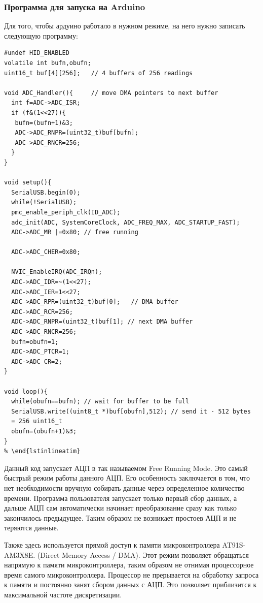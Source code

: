 \documentclass[../paper.tex]{subfiles}
\begin{document}
\subsubsection{Программа для запуска на Arduino}
Для того, чтобы ардуино работало в нужном режиме, на него нужно записать следующую программу:
\begin{lstlisting}
#undef HID_ENABLED
volatile int bufn,obufn;
uint16_t buf[4][256];   // 4 buffers of 256 readings

void ADC_Handler(){     // move DMA pointers to next buffer
  int f=ADC->ADC_ISR;
  if (f&(1<<27)){
   bufn=(bufn+1)&3;
   ADC->ADC_RNPR=(uint32_t)buf[bufn];
   ADC->ADC_RNCR=256;
  } 
}

void setup(){
  SerialUSB.begin(0);
  while(!SerialUSB);
  pmc_enable_periph_clk(ID_ADC);
  adc_init(ADC, SystemCoreClock, ADC_FREQ_MAX, ADC_STARTUP_FAST);
  ADC->ADC_MR |=0x80; // free running

  ADC->ADC_CHER=0x80; 

  NVIC_EnableIRQ(ADC_IRQn);
  ADC->ADC_IDR=~(1<<27);
  ADC->ADC_IER=1<<27;
  ADC->ADC_RPR=(uint32_t)buf[0];   // DMA buffer
  ADC->ADC_RCR=256;
  ADC->ADC_RNPR=(uint32_t)buf[1]; // next DMA buffer
  ADC->ADC_RNCR=256;
  bufn=obufn=1;
  ADC->ADC_PTCR=1;
  ADC->ADC_CR=2;
}

void loop(){
  while(obufn==bufn); // wait for buffer to be full
  SerialUSB.write((uint8_t *)buf[obufn],512); // send it - 512 bytes
  = 256 uint16_t
  obufn=(obufn+1)&3;    
}
% \end{lstinlineatim}
\end{lstlisting}


Данный код запускает АЦП в так называемом Free Running Mode. Это самый быстрый режим работы данного АЦП. Его особенность заключается в том, что нет необходимости вручную собирать данные через определенное количество времени. Программа пользователя запускает только первый сбор данных, а дальше АЦП сам автоматически начинает преобразование сразу как только закончилось предыдущее. Таким образом не возникает простоев АЦП и не теряются данные.

Также здесь используется прямой доступ к памяти микроконтроллера AT91S-AM3X8E. (Direct Memory Access / DMA). Этот режим позволяет обращаться напрямую к памяти микроконтроллера, таким образом не отнимая процессорное время самого микроконтроллера. Процессор не прерывается на обработку запроса к памяти и постоянно занят сбором данных с АЦП. Это позволяет приблизится к максимальной частоте дискретизации.
\end{document}
